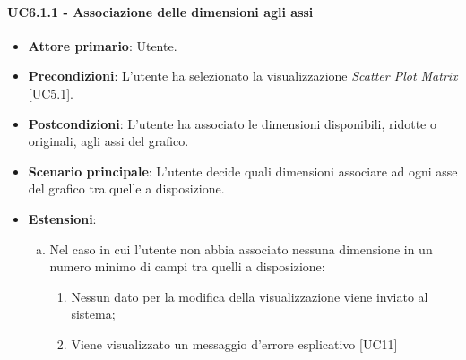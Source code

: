 \paragraph{UC6.1.1 - Associazione delle dimensioni agli assi}
\begin{itemize}
	\item \textbf{Attore primario}: Utente.
	\item \textbf{Precondizioni}: L'utente ha selezionato la visualizzazione \textit{Scatter Plot Matrix} [UC5.1].
	\item \textbf{Postcondizioni}: L'utente ha associato le dimensioni disponibili, ridotte o originali, agli assi del grafico. 
	
	\item \textbf{Scenario principale}: L'utente decide quali dimensioni associare ad ogni asse del grafico tra quelle a disposizione.
	
		\item \textbf{Estensioni}:
	\begin{enumerate}[(a)]
		\item Nel caso in cui l'utente non abbia associato nessuna dimensione in un numero minimo di campi tra quelli a disposizione:
		\begin{enumerate}[1.]
			\item Nessun dato per la modifica della visualizzazione viene inviato al sistema;
			\item Viene visualizzato un messaggio d'errore esplicativo [UC11]
		\end{enumerate}
	\end{enumerate}
\end{itemize}